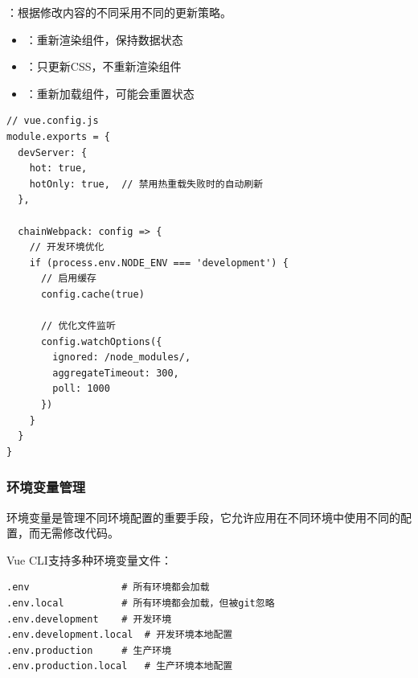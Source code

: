 ：根据修改内容的不同采用不同的更新策略。

\begin{itemize}
\tightlist
\item
  ：重新渲染组件，保持数据状态
\item
  ：只更新CSS，不重新渲染组件
\item
  ：重新加载组件，可能会重置状态
\end{itemize}


\begin{lstlisting}[style=javascript]
// vue.config.js
module.exports = {
  devServer: {
    hot: true,
    hotOnly: true,  // 禁用热重载失败时的自动刷新
  },
  
  chainWebpack: config => {
    // 开发环境优化
    if (process.env.NODE_ENV === 'development') {
      // 启用缓存
      config.cache(true)
      
      // 优化文件监听
      config.watchOptions({
        ignored: /node_modules/,
        aggregateTimeout: 300,
        poll: 1000
      })
    }
  }
}
\end{lstlisting}

\hypertarget{ux73afux5883ux53d8ux91cfux7ba1ux7406}{%
\subsubsection{环境变量管理}\label{ux73afux5883ux53d8ux91cfux7ba1ux7406}}

环境变量是管理不同环境配置的重要手段，它允许应用在不同环境中使用不同的配置，而无需修改代码。


Vue CLI支持多种环境变量文件：

\begin{lstlisting}[style=terminal]
.env                # 所有环境都会加载
.env.local          # 所有环境都会加载，但被git忽略
.env.development    # 开发环境
.env.development.local  # 开发环境本地配置
.env.production     # 生产环境
.env.production.local   # 生产环境本地配置
\end{lstlisting}


